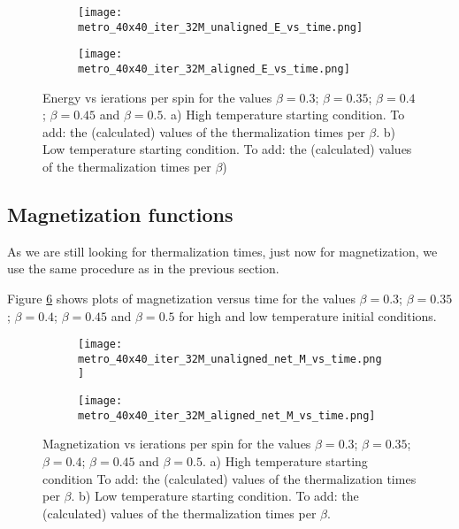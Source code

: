 \documentclass[11pt,a4paper]{article}
\begin{document}
\begin{figure}[h!]
\centering
\begin{subfigure}{.5\textwidth}
  \centering
  \texttt{[image: metro\_40x40\_iter\_32M\_unaligned\_E\_vs\_time.png]}
  \caption{}
  \label{fig:Evt_highT}
\end{subfigure}%
\begin{subfigure}{.5\textwidth}
  \centering
  \texttt{[image: metro\_40x40\_iter\_32M\_aligned\_E\_vs\_time.png]}
  \caption{}
  \label{fig:Evt_lowT}
\end{subfigure}
\caption{Energy vs ierations per spin for the values $\beta = 0.3$; $\beta = 0.35$;
         $\beta = 0.4$; $\beta = 0.45$ and $\beta = 0.5$. a) High temperature starting condition. 
         {\color{red}To add: the (calculated) values of the thermalization times per $\beta$}.
         b) Low temperature starting condition.
         {\color{red}To add: the (calculated) values of the thermalization times per $\beta$)}}
\label{fig:Evt}
\end{figure}


\subsection{Magnetization functions}
As we are still looking for thermalization times, just now for magnetization, we use the same procedure as in
 the previous section. 

Figure \ref{fig:Mvt} shows plots of magnetization versus time for the values $\beta = 0.3$; $\beta = 0.35$;
 $\beta = 0.4$; $\beta = 0.45$ and $\beta = 0.5$ for high and low temperature initial conditions. 


\begin{figure}[h!]
\centering
\begin{subfigure}{.5\textwidth}
  \centering
  \texttt{[image: metro\_40x40\_iter\_32M\_unaligned\_net\_M\_vs\_time.png]}
  \caption{}
  \label{fig:Mvt_highT}
\end{subfigure}%
\begin{subfigure}{.5\textwidth}
  \centering
  \texttt{[image: metro\_40x40\_iter\_32M\_aligned\_net\_M\_vs\_time.png]}
  \caption{}
  \label{fig:Mvt_lowT}
\end{subfigure}
\caption{Magnetization vs ierations per spin for the values $\beta = 0.3$; $\beta = 0.35$;
         $\beta = 0.4$; $\beta = 0.45$ and $\beta = 0.5$. a) High temperature starting condition
         {\color{red}To add: the (calculated) values of the thermalization times per $\beta$}.
         b) Low temperature starting condition.
         {\color{red}To add: the (calculated) values of the thermalization times per $\beta$}.}
\label{fig:Mvt}
\end{figure}
\end{document}
